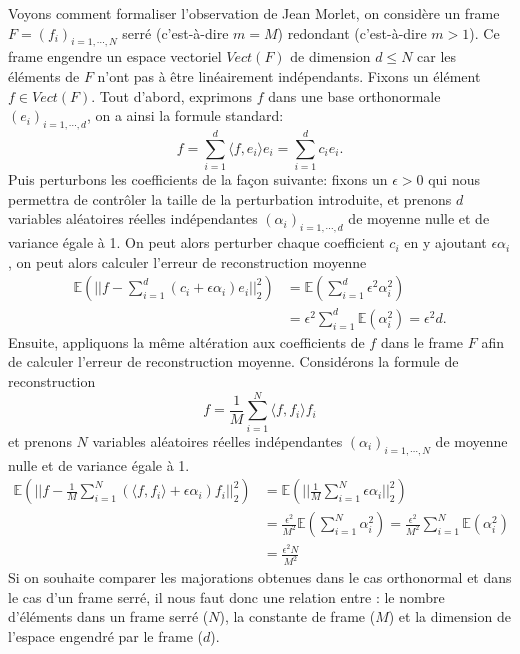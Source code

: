 Voyons comment formaliser l'observation de Jean Morlet, on considère un frame $F=(f_i)_{i=1,\cdots,N}$ serré (c'est-à-dire $m=M$) redondant (c'est-à-dire $m>1$).
Ce frame engendre un espace vectoriel $Vect(F)$ de dimension $d\leq N$ car les éléments de $F$ n'ont pas à être linéairement indépendants.
Fixons un élément $f\in Vect(F)$.
Tout d'abord, exprimons $f$ dans une base orthonormale $(e_i)_{i=1,\cdots, d}$, on a ainsi la formule standard:
\begin{equation*}
	f = \sum_{i=1}^d \langle f, e_i \rangle e_i = \sum_{i=1}^d c_i e_i.
\end{equation*}
Puis perturbons les coefficients de la façon suivante: fixons un $\epsilon >0$ qui nous permettra de contrôler la taille de la perturbation introduite, et prenons $d$ variables aléatoires réelles indépendantes $(\alpha_i)_{i=1,\cdots, d}$ de moyenne nulle et de variance égale à 1.
On peut alors perturber chaque coefficient $c_i$ en y ajoutant $\epsilon \alpha_i$, on peut alors calculer l'erreur de reconstruction moyenne
\begin{align*}
	\mathbb{E}\left(|| f- \sum_{i=1}^d (c_i + \epsilon \alpha_i)e_i||_2^2\right) &= \mathbb{E}\left(\sum_{i=1}^d \epsilon^2 \alpha_i^2\right)\\
		&= \epsilon^2 \sum_{i=1}^d \mathbb{E} (\alpha_i^2) = \epsilon^2 d \label{eq:errorth}.
\end{align*} 
Ensuite, appliquons la même altération aux coefficients de $f$ dans le frame $F$ afin de calculer l'erreur de reconstruction moyenne.
Considérons la formule de reconstruction
\begin{equation*}
	f = \frac{1}{M}\sum_{i=1}^N \langle f, f_i \rangle f_i
\end{equation*}
et prenons $N$ variables aléatoires réelles indépendantes $(\alpha_i)_{i=1, \cdots, N}$  de moyenne nulle et de variance égale à 1.
\begin{align}
	\mathbb{E}\left(|| f- \frac{1}{M}\sum_{i=1}^N (\langle f, f_i\rangle + \epsilon \alpha_i)f_i||_2^2\right) &= \mathbb{E}\left(||\frac{1}{M} \sum_{i=1}^N \epsilon \alpha_i||_2^2\right)\nonumber\\
	&= \frac{\epsilon^2}{M^2} \mathbb{E}(\sum_{i=1}^N \alpha_i^2) = \frac{\epsilon^2}{M^2} \sum_{i=1}^N \mathbb{E}(\alpha_i^2) \nonumber\\
	&= \frac{\epsilon^2 N}{M^2} \label{errframe}%
\end{align}
Si on souhaite comparer les majorations obtenues dans le cas orthonormal et dans le cas d'un frame serré, il nous faut donc une relation entre : le nombre d'éléments dans un frame serré ($N$), la constante de frame ($M$) et la dimension de l'espace engendré par le frame ($d$).
